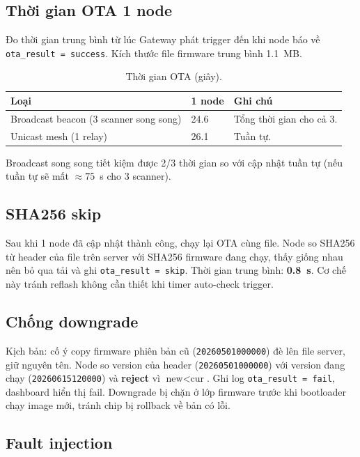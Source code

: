 \subsection{Thời gian OTA 1 node}

Đo thời gian trung bình từ lúc Gateway phát trigger đến khi node báo về \texttt{ota\_result = success}. Kích thước file firmware trung bình 1.1~MB.

\begin{table}[htp]
    \centering
    \caption{Thời gian OTA (giây).}
    \label{tab:ota-time}
    \begin{tabular}{lll}
        \hline
        \textbf{Loại} & \textbf{1 node} & \textbf{Ghi chú} \\
        \hline
        Broadcast beacon (3 scanner song song) & 24.6 & Tổng thời gian cho cả 3. \\
        Unicast mesh (1 relay) & 26.1 & Tuần tự. \\
        \hline
    \end{tabular}
\end{table}

Broadcast song song tiết kiệm được 2/3 thời gian so với cập nhật tuần tự (nếu tuần tự sẽ mất $\approx 75$~s cho 3 scanner).

\subsection{SHA256 skip}

Sau khi 1 node đã cập nhật thành công, chạy lại OTA cùng file. Node so SHA256 từ header của file trên server với SHA256 firmware đang chạy, thấy giống nhau nên bỏ qua tải và ghi \texttt{ota\_result = skip}. Thời gian trung bình: \textbf{0.8~s}. Cơ chế này tránh reflash không cần thiết khi timer auto-check trigger.

\subsection{Chống downgrade}

Kịch bản: cố ý copy firmware phiên bản cũ (\texttt{20260501000000}) đè lên file server, giữ nguyên tên. Node so version của header (\texttt{20260501000000}) với version đang chạy (\texttt{20260615120000}) và \textbf{reject} vì $\text{new} < \text{cur}$. Ghi log \texttt{ota\_result = fail}, dashboard hiển thị fail. Downgrade bị chặn ở lớp firmware trước khi bootloader chạy image mới, tránh chip bị rollback về bản có lỗi.

\subsection{Fault injection}

